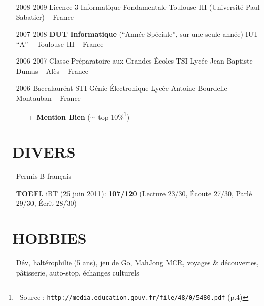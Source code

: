 \documentclass{res}
\begin{document}
\begin{resume}
\begin{itemize}
    \item[] 2008-2009 \tabto{2cm} Licence 3 Informatique Fondamentale \hfill Toulouse III (Universit\'e Paul Sabatier) -- France

    \item[] 2007-2008 \tabto{2cm} \textbf{DUT Informatique} (``Ann\'ee Sp\'eciale'', sur une seule ann\'ee) \hfill IUT ``A'' -- Toulouse III -- France

    \item[] 2006-2007 \tabto{2cm} Classe Pr\'eparatoire aux Grandes \'Ecoles TSI \hfill Lyc\'ee Jean-Baptiste Dumas -- Al\`es -- France

    \item[] 2006 \tabto{2cm} Baccalaur\'eat STI G\'enie \'Electronique \hfill Lyc\'ee Antoine Bourdelle -- Montauban -- France
        \begin{itemize}
            \item[+] \textbf{Mention Bien} ($\sim$ top 10\%\footnote{~Source : \texttt{http://media.education.gouv.fr/file/48/0/5480.pdf} (p.4)})
        \end{itemize}
    \end{itemize}

\section{\faMagic~DIVERS}
    \begin{itemize}
        \item[] Permis B fran\c{c}ais
        \item[] \textbf{TOEFL} iBT (25 juin 2011): \textbf{107/120} (Lecture 23/30, \'Ecoute 27/30, Parl\'e 29/30, \'Ecrit 28/30)
    \end{itemize}
 
\section{\faGamepad~HOBBIES}
    \begin{itemize}
        \item[] D\'ev, halt\'erophilie (5 ans), jeu de Go, MahJong MCR, voyages \& d\'ecouvertes, p\^atisserie, auto-stop, \'echanges culturels
    \end{itemize}


\end{resume}
\end{document}

